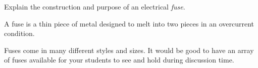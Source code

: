 

Explain the construction and purpose of an electrical {\it fuse}.







A fuse is a thin piece of metal designed to melt into two pieces in an overcurrent condition.







Fuses come in many different styles and sizes.  It would be good to have an array of fuses available for your students to see and hold during discussion time.




